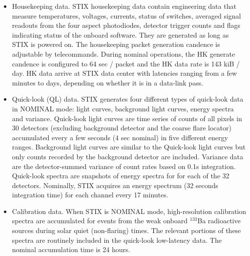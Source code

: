\documentclass{aa}
\begin{document}
\begin{itemize}
 \item  Housekeeping data.
STIX housekeeping data contain engineering  data that measure temperatures, voltages, currents, status of switches,
averaged signal readouts from the four aspect photodiodes, detector trigger counts and  flags indicating
status of the onboard software.
They are generated as long as STIX is powered on.
The housekeeping packet generation candence is adjustable by telecommands.
During nominal operations, the HK generate candence is configured to 64 sec / packet and
the HK data rate is 143 kiB / day.
HK data arrive at STIX data center with latencies ranging from a few minutes to days, depending on whether
it is in a data-link pass.

\item Quick-look (QL) data.
STIX generates four different types of quick-look data in NOMINAL mode: light curves, background light curves, energy spectra and variance.
Quick-look light curves are  time series of counts
of all pixels in 30 detectors (excluding background detector and the coarse flare locator)
accumulated every a few seconds (4 sec nominal) in five different energy ranges.
Background light curves are similar to the Quick-look light curves but only
counts recorded by the background detector are included.
Variance data are
the detector-summed variance of count rates
based on 0.1s integration.
Quick-look spectra are snapshots of energy spectra for for each of the 32 detectors.
Nominally, STIX acquires an energy spectrum (32 seconds integration time) for each channel every 17 minutes.

\item
Calibration data. When STIX is NOMINAL mode, high-resolution calibration spectra  are accumulated for events from the weak onboard $^{133}$Ba
radioactive sources during solar quiet  (non-flaring)  times. The relevant portions of these
spectra are routinely included in the quick-look low-latency data.
The nominal accumulation time is 24 hours.


\end{itemize}
\end{document}

